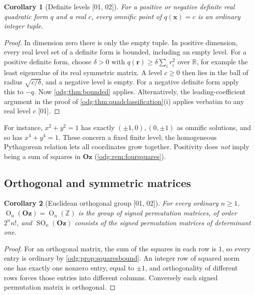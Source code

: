 \documentclass[11pt,oneside]{article}
\numberwithin{equation}{section}
\newtheorem{corollary}[corollary]{Corollary}
\theoremstyle{definition}
\theoremstyle{remark}
\newcommand{\Oz}{\mathbf{Oz}}
\newcommand{\Z}{\mathbb Z}
\newcommand{\R}{\mathbb R}
\newcommand{\SO}{\operatorname{SO}}
\newcommand{\OO}{\operatorname O}
\newcommand{\src}[1]{\textup{\textsf{\small[#1]}}}
\begin{document}
\begin{corollary}[Definite levels \src{01, 02}]\label{odg:cor:definite}
For a positive or negative definite real quadratic form $q$ and a real $c$,
every omnific point of $q(\mathbf x)=c$ is an ordinary integer tuple.
\end{corollary}
\begin{proof}
In dimension zero there is only the empty tuple. In positive dimension,
every real level set of a definite form is bounded, including an empty
level. For a positive definite form, choose $\delta>0$ with
$q(\mathbf r)\ge\delta\sum_i r_i^2$ over $\R$, for example the least
eigenvalue of its real symmetric matrix. A level $c\ge0$ then lies in the
ball of radius $\sqrt{c/\delta}$, and a negative level is empty. For a
negative definite form apply this to $-q$. Now \cref{odg:thm:bounded} applies.
Alternatively, the leading-coefficient
argument in the proof of \cref{odg:thm:quadclassification}(i) applies
verbatim to any real level $c$ \src{01}.
\end{proof}

For instance, $x^2+y^2=1$ has exactly $(\pm1,0),(0,\pm1)$ as omnific
solutions, and so has $x^4+y^4=1$. These concern a fixed finite level; the
homogeneous Pythagorean relation lets all coordinates grow together.
Positivity does \emph{not} imply being a sum of squares in $\Oz$
(\cref{odg:rem:foursquares}).

\subsection{Orthogonal and symmetric matrices}

\begin{corollary}[Euclidean orthogonal group \src{01, 02}]\label{odg:cor:orthogonal}
For every ordinary $n\ge1$, $\OO_n(\Oz)=\OO_n(\Z)$ is the group of signed
permutation matrices, of order $2^nn!$, and $\SO_n(\Oz)$ consists of the
signed permutation matrices of determinant one.
\end{corollary}
\begin{proof}
For an orthogonal matrix, the sum of the squares in each row is $1$, so
every entry is ordinary by \cref{odg:prop:squaresbound}. An integer row of
squared norm one has exactly one nonzero entry, equal to $\pm1$, and
orthogonality of different rows forces those entries into different
columns. Conversely each signed permutation matrix is orthogonal.
\end{proof}
\end{document}
